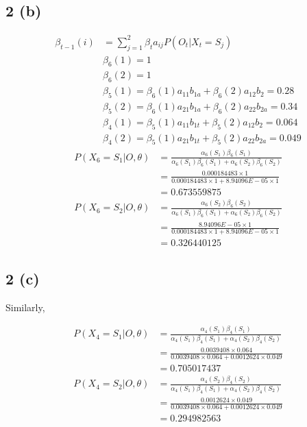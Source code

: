 \documentclass[10pt,letterpaper]{article}
\begin{document}
\subsection{2 (b)}  	
\begin{align*}
\beta_{t-1}(i) &= \sum_{j=1}^2 \beta_{t}a_{ij}P(O_t|X_t=S_j)\\
&\beta_6(1) = 1\\
&\beta_6(2) = 1\\
&\beta_5(1) = \beta_6(1)a_{11}b_{1a} + \beta_6(2)a_{12}b_{2} =0.28 \\
&\beta_5(2) = \beta_6(1)a_{21}b_{1a} + \beta_6(2)a_{22}b_{2a} = 0.34\\
&\beta_4(1) = \beta_5(1)a_{11}b_{1t} + \beta_5(2)a_{12}b_{2} =  0.064\\
&\beta_4(2) = \beta_5(1)a_{21}b_{1t} + \beta_5(2)a_{22}b_{2a} =0.049
\end{align*}
\begin{align*}
				P(X_6=S_1 | O, \theta) &= \frac{\alpha_6(S_1)\beta_6(S_1)}{\alpha_6(S_1)\beta_6(S_1)+\alpha_6(S_2)\beta_6(S_2)}\\
				&= \frac{0.000184483\times  1}{0.000184483\times 1 +8.94096E-05\times 1}\\
				&= 0.673559875\\
				P(X_6=S_2 | O, \theta) &= \frac{\alpha_6(S_2)\beta_6(S_2)}{\alpha_6(S_1)\beta_6(S_1)+\alpha_6(S_2)\beta_6(S_2)}\\
				&= \frac{8.94096E-05 \times 1}{0.000184483\times 1 +8.94096E-05\times 1} \\
				&= 0.326440125
				\end{align*}

\subsection{2 (c)}  
Similarly,	

\begin{align*}
P(X_4=S_1 | O, \theta) &= \frac{\alpha_4(S_1)\beta_4(S_1)}{\alpha_4(S_1)\beta_4(S_1)+\alpha_4(S_2)\beta_4(S_2)}\\
				&= \frac{0.0039408\times  0.064}{0.0039408\times 0.064 +0.0012624\times 0.049}\\
				&= 0.705017437\\
P(X_4=S_2 | O, \theta) &= \frac{\alpha_4(S_2)\beta_4(S_2)}{\alpha_4(S_1)\beta_4(S_1)+\alpha_4(S_2)\beta_4(S_2)}\\
				&= \frac{0.0012624\times  0.049}{0.0039408\times 0.064 +0.0012624\times 0.049}\\
				&= 0.294982563
				\end{align*}
\end{document}
